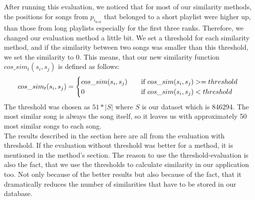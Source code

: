 After running this evaluation, we noticed that for most of our similarity methods, the positions for songs from $p_{i_{test}} $ that belonged to a short playlist were higher up, than those from long playlists especially for the first three ranks. Therefore, we changed our evaluation method a little bit. We set a threshold for each similarity method, and if the similarity between two songs was smaller than this threshold, we set the similarity to 0. This means, that our new similarity function $cos\_sim_t(s_i,s_j)$ is defined as follows:
\[   
cos\_sim_t(s_i,s_j) = 
     \begin{cases}
       \text{$ cos\_sim(s_i,s_j) $} &\quad\text{if $ cos\_sim(s_i,s_j)  >= threshold$}\\
       \text{$ 0 $} &\quad\text{if $ cos\_sim(s_i,s_j)  < threshold$}\\
     \end{cases}
\]
 The threshold was chosen as $ 51 * |S| $ where $ S $ is our dataset which is 846294. The most similar song is always the song itself, so it leaves us with approximately 50 most similar songs to each song. \\
The results described in the section here are all from the evaluation with threshold. If the evaluation without threshold was better for a method, it is mentioned in the method's section. The reason to use the threshold-evaluation is also the fact, that we use the thresholds to calculate similarity in our application too. Not only because of the better results but also because of the fact, that it dramatically reduces the number of similarities that have to be stored in our database.\\
